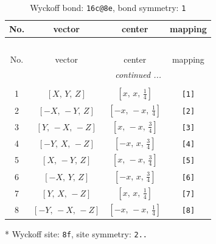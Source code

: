 \documentclass[fleqn,8pt]{jsarticle}
\begin{document}
\renewcommand{\arraystretch}{1.2}
\begin{longtable}{cccc}
\caption{Wyckoff bond: {\tt 16c@8e}, bond symmetry: {\tt 1}}
 \\
 \hline \hline
No. & vector & center & mapping \\ \hline \endfirsthead

\multicolumn{3}{l}{\tablename\ \thetable{}} \\
 \hline \hline
No. & vector & center & mapping \\ \hline \endhead

 \hline \hline
\multicolumn{3}{r}{\footnotesize\it continued ...} \\ \endfoot

 \hline \hline
\multicolumn{3}{r}{} \\ \endlastfoot

1 & $\left[ X,\, Y,\, Z \right]$ & $\left[ x,\, x,\, \frac{1}{4} \right]$ & {\tt [1]} \\ \hline
2 & $\left[ - X,\, - Y,\, Z \right]$ & $\left[ - x,\, - x,\, \frac{1}{4} \right]$ & {\tt [2]} \\ \hline
3 & $\left[ Y,\, - X,\, - Z \right]$ & $\left[ x,\, - x,\, \frac{3}{4} \right]$ & {\tt [3]} \\ \hline
4 & $\left[ - Y,\, X,\, - Z \right]$ & $\left[ - x,\, x,\, \frac{3}{4} \right]$ & {\tt [4]} \\ \hline
5 & $\left[ X,\, - Y,\, Z \right]$ & $\left[ x,\, - x,\, \frac{3}{4} \right]$ & {\tt [5]} \\ \hline
6 & $\left[ - X,\, Y,\, Z \right]$ & $\left[ - x,\, x,\, \frac{3}{4} \right]$ & {\tt [6]} \\ \hline
7 & $\left[ Y,\, X,\, - Z \right]$ & $\left[ x,\, x,\, \frac{1}{4} \right]$ & {\tt [7]} \\ \hline
8 & $\left[ - Y,\, - X,\, - Z \right]$ & $\left[ - x,\, - x,\, \frac{1}{4} \right]$ & {\tt [8]} \\
\end{longtable}
* Wyckoff site: {\tt 8f}, site symmetry: {\tt 2..}
\renewcommand{\arraystretch}{1.2}
\end{document}
